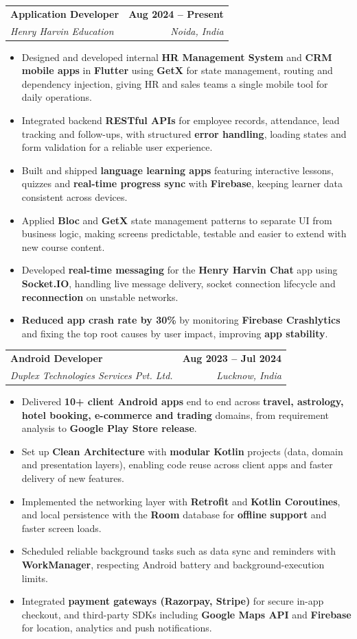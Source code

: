 \documentclass[11pt]{article}
\makeatletter
\newcommand{\resumeItem}[1]{
  \item\small{
    {#1 \vspace{-2pt}}
  }
}
\newcommand{\resumeSubheading}[4]{
  \vspace{-2pt}\item
    \begin{tabular*}{0.97\textwidth}[t]{l@{\extracolsep{\fill}}r}
      \textbf{#1} & \textbf{\small #2} \\
      \textit{\small#3} & \textit{\small #4} \\
    \end{tabular*}\vspace{-7pt}
}
\newcommand{\resumeItemListStart}{\begin{itemize}}
\newcommand{\resumeItemListEnd}{\end{itemize}\vspace{-5pt}}
\makeatother
\begin{document}
    \resumeSubheading
      {Application Developer}{Aug 2024 -- Present}
      {Henry Harvin Education}{Noida, India}
      \resumeItemListStart
        \resumeItem{Designed and developed internal \textbf{HR Management System} and \textbf{CRM mobile apps} in \textbf{Flutter} using \textbf{GetX} for state management, routing and dependency injection, giving HR and sales teams a single mobile tool for daily operations.}
        \resumeItem{Integrated backend \textbf{RESTful APIs} for employee records, attendance, lead tracking and follow-ups, with structured \textbf{error handling}, loading states and form validation for a reliable user experience.}
        \resumeItem{Built and shipped \textbf{language learning apps} featuring interactive lessons, quizzes and \textbf{real-time progress sync} with \textbf{Firebase}, keeping learner data consistent across devices.}
        \resumeItem{Applied \textbf{Bloc} and \textbf{GetX} state management patterns to separate UI from business logic, making screens predictable, testable and easier to extend with new course content.}
        \resumeItem{Developed \textbf{real-time messaging} for the \textbf{Henry Harvin Chat} app using \textbf{Socket.IO}, handling live message delivery, socket connection lifecycle and \textbf{reconnection} on unstable networks.}
        \resumeItem{\textbf{Reduced app crash rate by 30\%} by monitoring \textbf{Firebase Crashlytics} and fixing the top root causes by user impact, improving \textbf{app stability}.}
      \resumeItemListEnd

    \resumeSubheading
      {Android Developer}{Aug 2023 -- Jul 2024}
      {Duplex Technologies Services Pvt. Ltd.}{Lucknow, India}
      \resumeItemListStart
        \resumeItem{Delivered \textbf{10+ client Android apps} end to end across \textbf{travel, astrology, hotel booking, e-commerce and trading} domains, from requirement analysis to \textbf{Google Play Store release}.}
        \resumeItem{Set up \textbf{Clean Architecture} with \textbf{modular Kotlin} projects (data, domain and presentation layers), enabling code reuse across client apps and faster delivery of new features.}
        \resumeItem{Implemented the networking layer with \textbf{Retrofit} and \textbf{Kotlin Coroutines}, and local persistence with the \textbf{Room} database for \textbf{offline support} and faster screen loads.}
        \resumeItem{Scheduled reliable background tasks such as data sync and reminders with \textbf{WorkManager}, respecting Android battery and background-execution limits.}
        \resumeItem{Integrated \textbf{payment gateways (Razorpay, Stripe)} for secure in-app checkout, and third-party SDKs including \textbf{Google Maps API} and \textbf{Firebase} for location, analytics and push notifications.}
      \resumeItemListEnd
\end{document}
